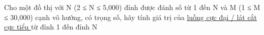 Cho một đồ thị với N (2 ≤ N ≤ 5,000) đỉnh được đánh số từ 1 đến N và M (1 ≤ M ≤ 30,000) cạnh vô hướng, có trọng số, hãy tính giá trị của   \href{http://en.wikipedia.org/wiki/Maximum_flow_problem}{    luồng cực đại / lát cắt cực tiểu   }   từ đỉnh 1 đến đỉnh N